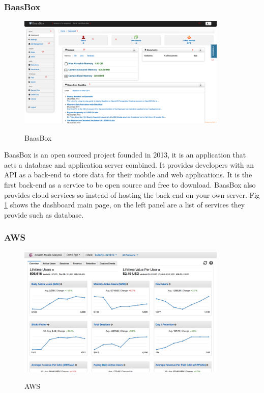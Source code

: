 \subsubsection{BaasBox}

\begin{figure}[!h]
    \caption{BaasBox}
    \centering
    \includegraphics[width=100mm]{images/baasbox}
    \label{fig:baasbox}
\end{figure}

BaasBox \cite{baasBox} is an open sourced project founded in 2013, it is an application that acts a database and application server combined. It provides developers with an API as a back-end to store data for their mobile and web applications. It is the first back-end as a service to be open source and free to download. BaasBox also provides cloud services so instead of hosting the back-end on your own server. Fig \ref{fig:baasbox} shows the dashboard main page, on the left panel are a list of services they provide such as database.

\subsubsection{AWS}

\begin{figure}[!h]
    \caption{AWS}
    \centering
    \includegraphics[width=100mm]{images/aws}
    \label{fig:aws}
\end{figure}


